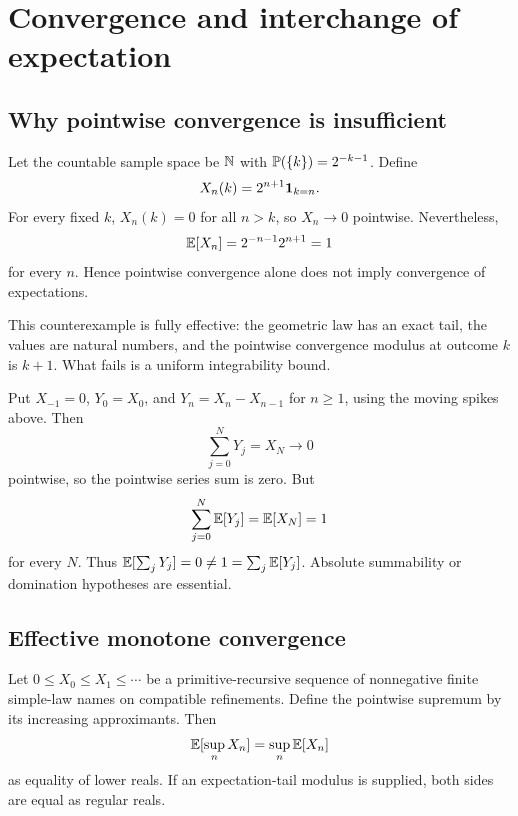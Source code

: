 \section{Convergence and interchange of expectation}\label{sec:convergence}

\subsection{Why pointwise convergence is insufficient}

\begin{example}\label{ex:moving-spike}
Let the countable sample space be \(\mathbb N\) with
\(\mathbb P(\{k\})=2^{-k-1}\).  Define
\[
 X_n(k)=2^{n+1}\mathbf 1_{k=n}.
\]
For every fixed \(k\), \(X_n(k)=0\) for all \(n>k\), so \(X_n\to0\)
pointwise.  Nevertheless,
\[
 \mathbb E[X_n]=2^{-n-1}2^{n+1}=1
\]
for every \(n\).  Hence pointwise convergence alone does not imply convergence
of expectations.
\end{example}

This counterexample is fully effective: the geometric law has an exact tail,
the values are natural numbers, and the pointwise convergence modulus at
outcome \(k\) is \(k+1\).  What fails is a uniform integrability bound.

\begin{example}
\label{ex:series-interchange}
Put \(X_{-1}=0\), \(Y_0=X_0\), and
\(Y_n=X_n-X_{n-1}\) for \(n\ge1\), using the moving spikes above.  Then
\[
 \sum_{j=0}^{N}Y_j=X_N\longrightarrow0
\]
pointwise, so the pointwise series sum is zero.  But
\[
 \sum_{j=0}^{N}\mathbb E[Y_j]=\mathbb E[X_N]=1
\]
for every \(N\).  Thus
\(\mathbb E[\sum_jY_j]=0\ne1=\sum_j\mathbb E[Y_j]\).
Absolute summability or domination hypotheses are essential.
\end{example}

\subsection{Effective monotone convergence}

\begin{theorem}
\label{thm:monotone-convergence}
Let \(0\le X_0\le X_1\le\cdots\) be a primitive-recursive sequence of
nonnegative finite simple-law names on compatible refinements.  Define the
pointwise supremum by its increasing approximants.  Then
\[
 \mathbb E[\sup_nX_n]=\sup_n\mathbb E[X_n]
\]
as equality of lower reals.  If an expectation-tail modulus is supplied, both
sides are equal as regular reals.
\end{theorem}

